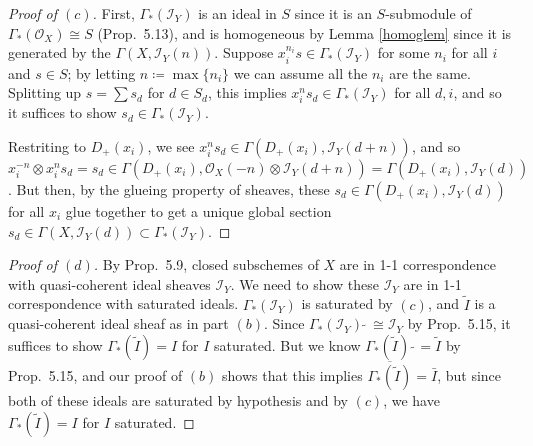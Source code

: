 \documentclass[12pt,letterpaper]{article}
\theoremstyle{definition}
\theoremstyle{remark}
\numberwithin{equation}{section}
\numberwithin{figure}{problem}
\newcommand{\II}{\mathscr{I}}
\newcommand{\OO}{\mathcal{O}}
\begin{document}
\begin{proof}[Proof of $(c)$]
  First, $\Gamma_*(\II_Y)$ is an ideal in $S$ since it is an $S$-submodule of $\Gamma_*(\OO_X) \cong S$ (Prop.~5.13), and is homogeneous by Lemma \ref{homoglem} since it is generated by the $\Gamma(X,\II_Y(n))$. Suppose $x_i^{n_i}s \in \Gamma_*(\II_Y)$ for some $n_i$ for all $i$ and $s \in S$; by letting $n \coloneqq \max\{n_i\}$ we can assume all the $n_i$ are the same. Splitting up $s = \sum s_d$ for $d \in S_d$, this implies $x_i^ns_d \in \Gamma_*(\II_Y)$ for all $d,i$, and so it suffices to show $s_d \in \Gamma_*(\II_Y)$.
  \par Restriting to $D_+(x_i)$, we see $x_i^ns_d \in \Gamma(D_+(x_i),\II_Y(d+n))$, and so $x_i^{-n} \otimes x_i^ns_d = s_d \in \Gamma(D_+(x_i),\OO_X(-n) \otimes \II_Y(d+n)) = \Gamma(D_+(x_i),\II_Y(d))$. But then, by the glueing property of sheaves, these $s_d \in \Gamma(D_+(x_i),\II_Y(d))$ for all $x_i$ glue together to get a unique global section $s_d \in \Gamma(X,\II_Y(d)) \subset \Gamma_*(\II_Y)$.
\end{proof}
\begin{proof}[Proof of $(d)$]
  By Prop.~5.9, closed subschemes of $X$ are in 1-1 correspondence with quasi-coherent ideal sheaves $\II_Y$. We need to show these $\II_Y$ are in 1-1 correspondence with saturated ideals. $\Gamma_*(\II_Y)$ is saturated by $(c)$, and $\tilde{I}$ is a quasi-coherent ideal sheaf as in part $(b)$. Since $\Gamma_*(\II_Y)\:\tilde{}\: \cong \II_Y$ by Prop.~5.15, it suffices to show $\Gamma_*(\tilde{I}) = I$ for $I$ saturated. But we know $\Gamma_*(\tilde{I})\:\tilde\: = \tilde{I}$ by Prop.~5.15, and our proof of $(b)$ shows that this implies $\overline{\Gamma_*(\tilde{I})} = \bar{I}$, but since both of these ideals are saturated by hypothesis and by $(c)$, we have $\Gamma_*(\tilde{I}) = I$ for $I$ saturated.
\end{proof}
\end{document}
